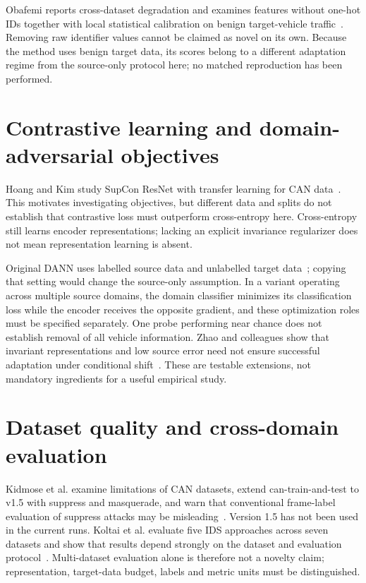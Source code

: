 \documentclass[12pt,a4paper,oneside,openany]{extbook}
\begin{document}
Obafemi reports cross-dataset degradation and examines features without one-hot IDs together with local statistical calibration on benign target-vehicle traffic~\cite{obafemi2026travel}. Removing raw identifier values cannot be claimed as novel on its own. Because the method uses benign target data, its scores belong to a different adaptation regime from the source-only protocol here; no matched reproduction has been performed.

\section{Contrastive learning and domain-adversarial objectives}
Hoang and Kim study SupCon ResNet with transfer learning for CAN data~\cite{hoang2022supcon}. This motivates investigating objectives, but different data and splits do not establish that contrastive loss must outperform cross-entropy here. Cross-entropy still learns encoder representations; lacking an explicit invariance regularizer does not mean representation learning is absent.

Original DANN uses labelled source data and unlabelled target data~\cite{ganin2016dann}; copying that setting would change the source-only assumption. In a variant operating across multiple source domains, the domain classifier minimizes its classification loss while the encoder receives the opposite gradient, and these optimization roles must be specified separately. One probe performing near chance does not establish removal of all vehicle information. Zhao and colleagues show that invariant representations and low source error need not ensure successful adaptation under conditional shift~\cite{zhao2019invariant}. These are testable extensions, not mandatory ingredients for a useful empirical study.

\section{Dataset quality and cross-domain evaluation}
Kidmose et al. examine limitations of CAN datasets, extend can-train-and-test to v1.5 with suppress and masquerade, and warn that conventional frame-label evaluation of suppress attacks may be misleading~\cite{kidmose2025cansleuth}. Version 1.5 has not been used in the current runs. Koltai et al. evaluate five IDS approaches across seven datasets and show that results depend strongly on the dataset and evaluation protocol~\cite{koltai2026trust}. Multi-dataset evaluation alone is therefore not a novelty claim; representation, target-data budget, labels and metric units must be distinguished.
\end{document}
